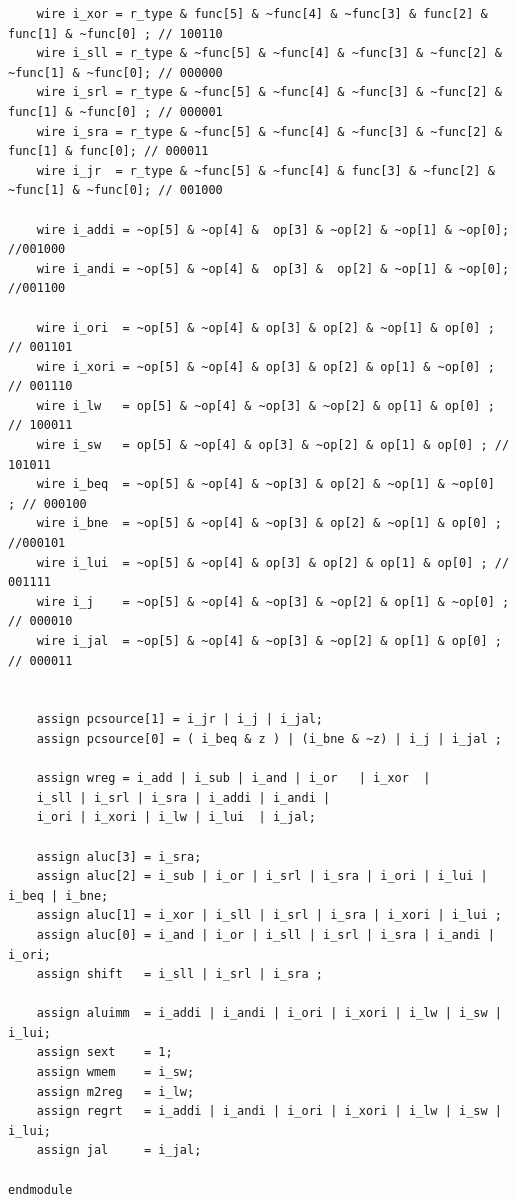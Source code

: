 \documentclass[UTF8]{ctexart}
\begin{document}
\begin{verbatim}
    wire i_xor = r_type & func[5] & ~func[4] & ~func[3] & func[2] & func[1] & ~func[0] ; // 100110
    wire i_sll = r_type & ~func[5] & ~func[4] & ~func[3] & ~func[2] & ~func[1] & ~func[0]; // 000000
    wire i_srl = r_type & ~func[5] & ~func[4] & ~func[3] & ~func[2] & func[1] & ~func[0] ; // 000001
    wire i_sra = r_type & ~func[5] & ~func[4] & ~func[3] & ~func[2] & func[1] & func[0]; // 000011
    wire i_jr  = r_type & ~func[5] & ~func[4] & func[3] & ~func[2] & ~func[1] & ~func[0]; // 001000

    wire i_addi = ~op[5] & ~op[4] &  op[3] & ~op[2] & ~op[1] & ~op[0]; //001000
    wire i_andi = ~op[5] & ~op[4] &  op[3] &  op[2] & ~op[1] & ~op[0]; //001100

    wire i_ori  = ~op[5] & ~op[4] & op[3] & op[2] & ~op[1] & op[0] ; // 001101
    wire i_xori = ~op[5] & ~op[4] & op[3] & op[2] & op[1] & ~op[0] ; // 001110
    wire i_lw   = op[5] & ~op[4] & ~op[3] & ~op[2] & op[1] & op[0] ; // 100011
    wire i_sw   = op[5] & ~op[4] & op[3] & ~op[2] & op[1] & op[0] ; // 101011
    wire i_beq  = ~op[5] & ~op[4] & ~op[3] & op[2] & ~op[1] & ~op[0]  ; // 000100
    wire i_bne  = ~op[5] & ~op[4] & ~op[3] & op[2] & ~op[1] & op[0] ; //000101
    wire i_lui  = ~op[5] & ~op[4] & op[3] & op[2] & op[1] & op[0] ; // 001111
    wire i_j    = ~op[5] & ~op[4] & ~op[3] & ~op[2] & op[1] & ~op[0] ; // 000010
    wire i_jal  = ~op[5] & ~op[4] & ~op[3] & ~op[2] & op[1] & op[0] ; // 000011


    assign pcsource[1] = i_jr | i_j | i_jal;
    assign pcsource[0] = ( i_beq & z ) | (i_bne & ~z) | i_j | i_jal ;

    assign wreg = i_add | i_sub | i_and | i_or   | i_xor  |
    i_sll | i_srl | i_sra | i_addi | i_andi |
    i_ori | i_xori | i_lw | i_lui  | i_jal;

    assign aluc[3] = i_sra;
    assign aluc[2] = i_sub | i_or | i_srl | i_sra | i_ori | i_lui | i_beq | i_bne;
    assign aluc[1] = i_xor | i_sll | i_srl | i_sra | i_xori | i_lui ;
    assign aluc[0] = i_and | i_or | i_sll | i_srl | i_sra | i_andi | i_ori;
    assign shift   = i_sll | i_srl | i_sra ;

    assign aluimm  = i_addi | i_andi | i_ori | i_xori | i_lw | i_sw | i_lui;
    assign sext    = 1;
    assign wmem    = i_sw;
    assign m2reg   = i_lw;
    assign regrt   = i_addi | i_andi | i_ori | i_xori | i_lw | i_sw | i_lui;
    assign jal     = i_jal;

endmodule


\end{verbatim}
\end{document}
